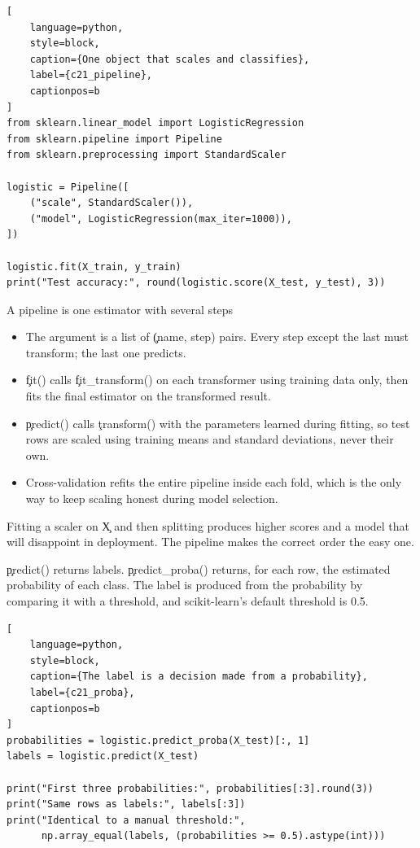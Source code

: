 \begin{lstlisting}[
    language=python,
    style=block,
    caption={One object that scales and classifies},
    label={c21_pipeline},
    captionpos=b
]
from sklearn.linear_model import LogisticRegression
from sklearn.pipeline import Pipeline
from sklearn.preprocessing import StandardScaler

logistic = Pipeline([
    ("scale", StandardScaler()),
    ("model", LogisticRegression(max_iter=1000)),
])

logistic.fit(X_train, y_train)
print("Test accuracy:", round(logistic.score(X_test, y_test), 3))
\end{lstlisting}

\begin{SyntaxBox}{A pipeline is one estimator with several steps}
\begin{itemize}
    \item The argument is a list of \c{(name, step)} pairs. Every step except
          the last must transform; the last one predicts.
    \item \c{fit()} calls \c{fit_transform()} on each transformer using training
          data only, then fits the final estimator on the transformed result.
    \item \c{predict()} calls \c{transform()} with the parameters learned during
          fitting, so test rows are scaled using training means and standard
          deviations, never their own.
    \item Cross-validation refits the entire pipeline inside each fold, which is
          the only way to keep scaling honest during model selection.
\end{itemize}
Fitting a scaler on \c{X} and then splitting produces higher scores and a model
that will disappoint in deployment. The pipeline makes the correct order the
easy one.
\end{SyntaxBox}


\c{predict()} returns labels. \c{predict_proba()} returns, for each row, the
estimated probability of each class. The label is produced from the probability
by comparing it with a threshold, and scikit-learn's default threshold is 0.5.

\begin{lstlisting}[
    language=python,
    style=block,
    caption={The label is a decision made from a probability},
    label={c21_proba},
    captionpos=b
]
probabilities = logistic.predict_proba(X_test)[:, 1]
labels = logistic.predict(X_test)

print("First three probabilities:", probabilities[:3].round(3))
print("Same rows as labels:", labels[:3])
print("Identical to a manual threshold:",
      np.array_equal(labels, (probabilities >= 0.5).astype(int)))
\end{lstlisting}

